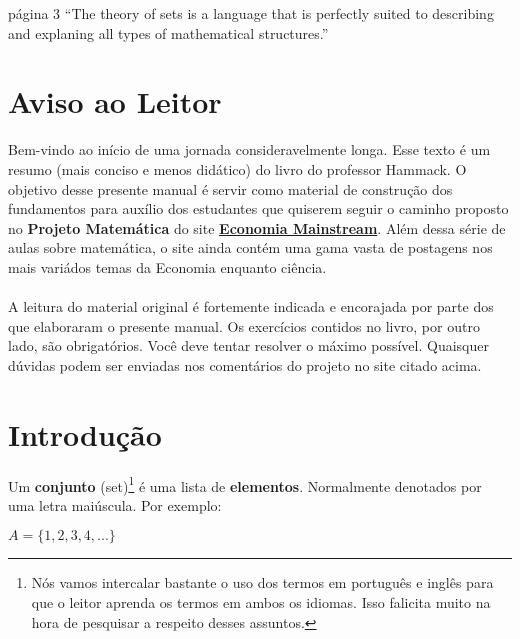 \documentclass[main.tex]{subfiles}
\begin{document}
\begin{chapquote}{página 3}
	``The theory of sets is a language that is perfectly suited to describing and explaning all types of mathematical structures.''
\end{chapquote}

\section*{Aviso ao Leitor}

Bem-vindo ao início de uma jornada consideravelmente longa. Esse texto é um resumo (mais conciso e menos didático) do livro do professor Hammack. O objetivo desse presente manual é servir como material de construção dos fundamentos para auxílio dos estudantes que quiserem seguir o caminho proposto no \textbf{Projeto Matemática} do site \href{https://economiamainstream.com.br/artigo/matematica/}{\textbf{Economia Mainstream}}. Além dessa série de aulas sobre matemática, o site ainda contém uma gama vasta de postagens nos mais variádos temas da Economia enquanto ciência.
\\~\\
A leitura do material original é fortemente indicada e encorajada por parte dos que elaboraram o presente manual. Os exercícios contidos no livro, por outro lado, são obrigatórios. Você deve tentar resolver o máximo possível. Quaisquer dúvidas podem ser enviadas nos comentários do projeto no site citado acima.

\section{Introdução}

Um \textbf{conjunto} (set)\footnote{Nós vamos intercalar bastante o uso dos termos em português e inglês para que o leitor aprenda os termos em ambos os idiomas. Isso falicita muito na hora de pesquisar a respeito desses assuntos.} é uma lista de \textbf{elementos}. Normalmente denotados por uma letra maiúscula. Por exemplo:

\begin{center}
	$ A = \{1 , 2 , 3 , 4 , ... \} $
\end{center}
\end{document}
